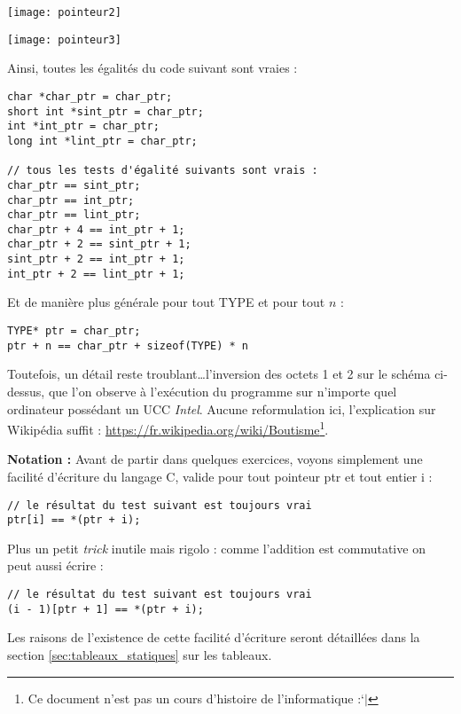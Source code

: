 \documentclass[../../../main.tex]{subfiles}
\begin{document}
\begin{minipage}{0.5\textwidth}
\begin{center}
		\texttt{[image: pointeur2]}
	\end{center}
\end{minipage}
\begin{minipage}{0.5\textwidth}
\begin{center}
		\texttt{[image: pointeur3]}
	\end{center}
\end{minipage}
 
Ainsi, toutes les égalités du code suivant sont vraies :
\begin{verbatim}
char *char_ptr = char_ptr;
short int *sint_ptr = char_ptr;
int *int_ptr = char_ptr;
long int *lint_ptr = char_ptr;

// tous les tests d'égalité suivants sont vrais :
char_ptr == sint_ptr;
char_ptr == int_ptr;
char_ptr == lint_ptr;
char_ptr + 4 ==	int_ptr + 1;
char_ptr + 2 == sint_ptr + 1;
sint_ptr + 2 == int_ptr + 1;
int_ptr + 2 == lint_ptr + 1;
\end{verbatim}
Et de manière plus générale pour tout \textsf{TYPE} et pour tout $n$ :
\begin{verbatim}
TYPE* ptr = char_ptr;
ptr + n == char_ptr + sizeof(TYPE) * n
\end{verbatim}
Toutefois, un détail reste troublant\dots l'inversion des octets 1 et 2 sur le schéma ci-dessus, que l'on observe à l'exécution du programme sur n'importe quel ordinateur possédant un UCC \textit{Intel}. 
Aucune reformulation ici, l'explication sur Wikipédia suffit : \url{https://fr.wikipedia.org/wiki/Boutisme}\footnote{Ce document n'est pas un cours d'histoire de l'informatique :`$|$}.
 
\textbf{Notation :} Avant de partir dans quelques exercices, voyons simplement une facilité d'écriture du langage C, valide pour tout pointeur \textsf{ptr} et tout entier \textsf{i} :
\begin{verbatim}
// le résultat du test suivant est toujours vrai
ptr[i] == *(ptr + i);
\end{verbatim}
Plus un petit \textit{trick} inutile mais rigolo : comme l'addition est commutative on peut aussi écrire :
\begin{verbatim}
// le résultat du test suivant est toujours vrai
(i - 1)[ptr + 1] == *(ptr + i);
\end{verbatim}
Les raisons de l'existence de cette facilité d'écriture seront détaillées dans la section \ref{sec:tableaux_statiques} sur les tableaux.
\end{document}

